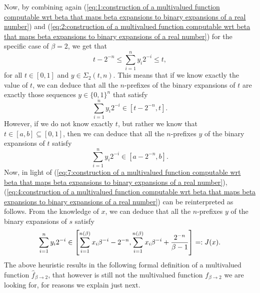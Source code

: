 Now, by combining again (\ref{eq:1:construction of a multivalued function computable wrt beta that maps beta expansions to binary expansions of a real number}) and (\ref{eq:2:construction of a multivalued function computable wrt beta that maps beta expansions to binary expansions of a real number}) for the specific case of $\beta = 2$, we get that
\begin{equation}\label{eq:5:construction of a multivalued function computable wrt beta that maps beta expansions to binary expansions of a real number}
    t - 2^{-n} \leq \sum_{i=1}^{n} y_i 2^{-i} \leq t,
\end{equation}
for all $t \in [0,1]$ and $y \in \Sigma_2(t,n)$. This means that if we know exactly the value of $t$, we can deduce that all the $n$-prefixes of the binary expansions of $t$ are exactly those sequences $y \in \{0,1\}^n$ that satisfy 
\begin{equation}\label{eq:6:construction of a multivalued function computable wrt beta that maps beta expansions to binary expansions of a real number}
    \sum_{i=1}^{n} y_i 2^{-i} \in [t-2^{-n}, t].
\end{equation}
However, if we do not know exactly $t$, but rather we know that $t \in [a,b] \subseteq [0,1]$, then we can deduce that all the $n$-prefixes $y$ of the binary expansions of $t$ satisfy
\begin{equation}\label{eq:7:construction of a multivalued function computable wrt beta that maps beta expansions to binary expansions of a real number}
    \sum_{i=1}^{n} y_i 2^{-i} \in [a-2^{-n}, b].
\end{equation}
Now, in light of (\ref{eq:7:construction of a multivalued function computable wrt beta that maps beta expansions to binary expansions of a real number}), (\ref{eq:4:construction of a multivalued function computable wrt beta that maps beta expansions to binary expansions of a real number}) can be reinterpreted as follows. From the knowledge of $x$, we can deduce that all the $n$-prefixes $y$ of the binary expansions of $s$ satisfy
\begin{equation}\label{eq:J x:construction of a multivalued function computable wrt beta that maps beta expansions to binary expansions of a real number}
    \sum_{i=1}^{n} y_i 2^{-i} \in \left[\sum_{i=1}^{n(\beta)} x_i \beta^{-i} - 2^{-n},  \sum_{i=1}^{n(\beta)} x_i \beta^{-i}+ \frac{2^{-n}}{\beta-1} \right] =: J(x).
\end{equation}
The above heuristic results in the following formal definition of a multivalued function $\hat f_{\beta \to 2}$, that however is still not the multivalued function $f_{\beta \to 2}$ we are looking for, for reasons we explain just next.
